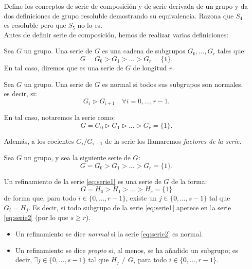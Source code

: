 \newpage
\begin{ejercicio}
    Define los conceptos de serie de composición y de serie derivada de un grupo y da dos definiciones de grupo resoluble demostrando su equivalencia. Razona que \(S_4\) es resoluble pero que \(S_5\) no lo es.\\

    Antes de definir serie de composición, hemos de realizar varias definiciones:
    \begin{definicion}[Serie]
        Sea \(G\) un grupo. Una serie de $G$ es una cadena de subgrupos $G_0,\dots,G_r$ tales que:
        \begin{equation*}
            G = G_0 > G_1 > \ldots > G_r = \{1\}.
        \end{equation*}
        En tal caso, diremos que es una serie de \(G\) de longitud \(r\).
    \end{definicion}
    \begin{definicion}
        Sea \(G\) un grupo. Una serie de \(G\) es normal si todos sus subgrupos son normales, es decir, si:
        \begin{equation*}
            G_i \rhd G_{i+1} \quad \forall i = 0, \ldots, r-1.
        \end{equation*}

        En tal caso, notaremos la serie como:
        \begin{equation*}
            G = G_0 \rhd G_1 \rhd \ldots \rhd G_r = \{1\}.
        \end{equation*}

        Además, a los cocientes \(G_i/G_{i+1}\) de la serie los llamaremos \emph{factores de la serie}.
    \end{definicion}

    \begin{definicion}
        Sea \(G\) un grupo, y sea la siguiente serie de \(G\):
        \begin{equation}\label{eq:serie1}
            G = G_0 > G_1 > \ldots > G_r = \{1\}.
        \end{equation}
        
        Un refinamiento de la serie \eqref{eq:serie1} es una serie de \(G\) de la forma:
        \begin{equation}\label{eq:serie2}
            G = H_0 > H_1 > \ldots > H_s = \{1\}
        \end{equation}
        de forma que, para todo $i\in \{0,\ldots,r-1\}$, existe un \(j\in \{0,\ldots,s-1\}\) tal que $G_i = H_j$. Es decir, si todo subgrupo de la serie \eqref{eq:serie1} aperece en la serie \eqref{eq:serie2} (por lo que \(s\geq r\)).
        \begin{itemize}
            \item Un refinamiento se dice \emph{normal} si la serie \eqref{eq:serie2} es normal.
            \item Un refinamiento se dice \emph{propio} si, al menos, se ha añadido un subgrupo; es decir, $\exists j\in \{0,\ldots,s-1\}$ tal que $H_j \neq G_i$ para todo $i\in \{0,\ldots,r-1\}$.
        \end{itemize}
    \end{definicion}


\end{ejercicio}

